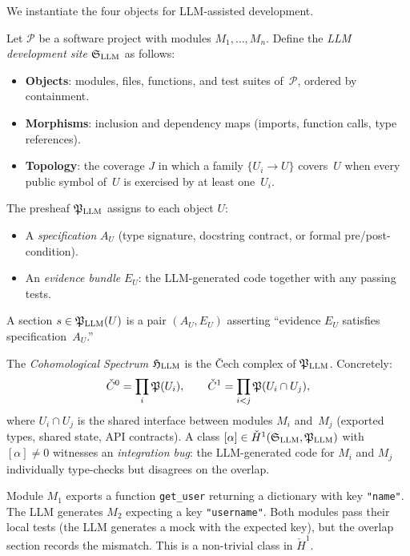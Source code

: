 We instantiate the four objects for LLM-assisted development.

\begin{definition}
\label{def:llm-site}
Let $\mathcal{P}$ be a software project with modules
$M_1,\dots,M_n$.  Define the \emph{LLM development site}
$\mathfrak{S}_{\mathrm{LLM}}$ as follows:
\begin{itemize}
  \item \textbf{Objects}: modules, files, functions, and test suites
        of~$\mathcal{P}$, ordered by containment.
  \item \textbf{Morphisms}: inclusion and dependency maps
        (imports, function calls, type references).
  \item \textbf{Topology}: the coverage $J$ in which a family
        $\{U_i \to U\}$ covers~$U$ when every public symbol of~$U$
        is exercised by at least one~$U_i$.
\end{itemize}
\end{definition}

\begin{definition}
\label{def:llm-pstr}
The presheaf $\mathfrak{P}_{\mathrm{LLM}}$ assigns to each object $U$:
\begin{itemize}
  \item A \emph{specification} $A_U$ (type signature, docstring
        contract, or formal pre/post-condition).
  \item An \emph{evidence bundle} $E_U$: the LLM-generated code
        together with any passing tests.
\end{itemize}
A section $s \in \mathfrak{P}_{\mathrm{LLM}}(U)$ is a pair $(A_U, E_U)$
asserting ``evidence $E_U$ satisfies specification~$A_U$\!.''
\end{definition}

The \emph{Cohomological Spectrum} $\mathfrak{H}_{\mathrm{LLM}}$ is the
\v{C}ech complex of $\mathfrak{P}_{\mathrm{LLM}}$.  Concretely:
\[
  \check{C}^0 = \prod_i \mathfrak{P}(U_i), \qquad
  \check{C}^1 = \prod_{i<j} \mathfrak{P}(U_i \cap U_j),
\]
where $U_i \cap U_j$ is the shared interface between modules $M_i$
and~$M_j$ (exported types, shared state, API contracts).  A class
$[\alpha] \in \check{H}^1(\mathfrak{S}_{\mathrm{LLM}}, \mathfrak{P}_{\mathrm{LLM}})$
with $[\alpha]\neq 0$ witnesses an \emph{integration bug}: the
LLM-generated code for $M_i$ and $M_j$ individually type-checks but
disagrees on the overlap.

\begin{example}
Module $M_1$ exports a function \texttt{get\_user} returning a
dictionary with key \texttt{"name"}.  The LLM generates $M_2$
expecting a key \texttt{"username"}.  Both modules pass their local
tests (the LLM generates a mock with the expected key), but the
overlap section records the mismatch.  This is a non-trivial class in
$\check{H}^1$.
\end{example}

